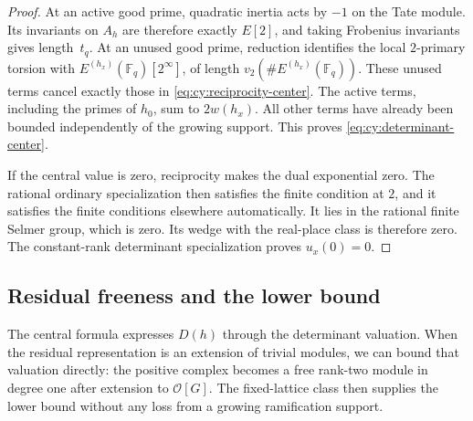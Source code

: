 \begin{proof}
At an active good prime, quadratic inertia acts by $-1$ on the Tate
module.  Its invariants on $A_h$ are therefore exactly $E[2]$, and taking
Frobenius invariants gives length~$t_q$.  At an unused good prime, reduction
identifies the local $2$-primary torsion with
$E^{(h_x)}(\mathbb F _q)[2^\infty]$, of length
$v_2(\#E^{(h_x)}(\mathbb F _q))$.  These unused terms cancel exactly
those in \eqref{eq:cy:reciprocity-center}.  The active terms, including the primes
of $h_0$, sum to $2w(h_x)$.  All other terms have already been bounded
independently of the growing support.  This proves
\eqref{eq:cy:determinant-center}.

If the central value is zero, reciprocity makes the dual exponential
zero.  The rational ordinary specialization then satisfies the finite
condition at $2$, and it satisfies the finite conditions elsewhere
automatically.  It lies in the rational finite Selmer group, which is
zero.  Its wedge with the real-place class is therefore zero.  The
constant-rank determinant specialization proves $u_x(0)=0$.
\end{proof}

\subsection{Residual freeness and the lower bound}

The central formula expresses $D(h)$ through the determinant valuation.
When the residual representation is an extension of trivial modules,
we can bound that valuation directly: the positive complex becomes a
free rank-two module in degree one after extension to $\mathcal O[G]$.
The fixed-lattice class then supplies the lower bound without any loss
from a growing ramification support.

